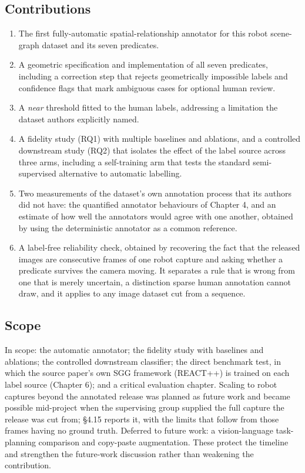 \subsection{Contributions}

\begin{enumerate}
\item The first fully-automatic spatial-relationship annotator for this robot
scene-graph dataset and its seven predicates.
\item A geometric specification and implementation of all seven predicates,
including a correction step that rejects geometrically impossible labels and confidence flags that mark ambiguous cases for optional human review.
\item A \textit{near} threshold fitted to the human labels, addressing a limitation the
dataset authors explicitly named.
\item A fidelity study (RQ1) with multiple baselines and ablations, and a
controlled downstream study (RQ2) that isolates the effect of the label source across three arms, including a self-training arm that tests the standard semi-supervised alternative to automatic labelling.
\item Two measurements of the dataset's own annotation process that its authors
did not have: the quantified annotator behaviours of Chapter 4, and an estimate of how well the annotators would agree with one another, obtained by using the deterministic annotator as a common reference.
\item A label-free reliability check, obtained by recovering the fact that the
released images are consecutive frames of one robot capture and asking whether a predicate survives the camera moving. It separates a rule that is wrong from one that is merely uncertain, a distinction sparse human annotation cannot draw, and it applies to any image dataset cut from a sequence.
\end{enumerate}

\subsection{Scope}

In scope: the automatic annotator; the fidelity study with baselines and ablations; the controlled downstream classifier; the direct benchmark test, in which the source paper's own SGG framework (REACT++) is trained on each label source (Chapter 6); and a critical evaluation chapter. Scaling to robot captures beyond the annotated release was planned as future work and became possible mid-project when the supervising group supplied the full capture the release was cut from; \S4.15 reports it, with the limits that follow from those frames having no ground truth. Deferred to future work: a vision-language task-planning comparison and copy-paste augmentation. These protect the timeline and strengthen the future-work discussion rather than weakening the contribution.

